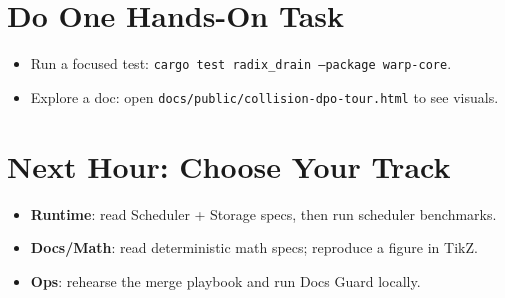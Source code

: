 \section{Do One Hands-On Task}
\begin{itemize}
    \item Run a focused test: \texttt{cargo test radix\_drain --package warp-core}.
    \item Explore a doc: open \texttt{docs/public/collision-dpo-tour.html} to see visuals.
\end{itemize}

\section{Next Hour: Choose Your Track}
\begin{itemize}
    \item \textbf{Runtime}: read Scheduler + Storage specs, then run scheduler benchmarks.
    \item \textbf{Docs/Math}: read deterministic math specs; reproduce a figure in TikZ.
    \item \textbf{Ops}: rehearse the merge playbook and run Docs Guard locally.
\end{itemize}
